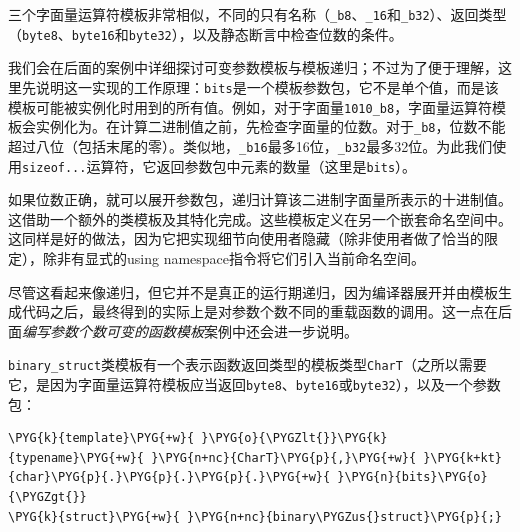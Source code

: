 
三个字面量运算符模板非常相似，不同的只有名称（\texttt{\_\allowbreak{}b8}、\texttt{\_\allowbreak{}16}和\texttt{\_\allowbreak{}b32}）、返回类型（\texttt{byte8}、\texttt{byte16}和\texttt{byte32}），以及静态断言中检查位数的条件。



我们会在后面的案例中详细探讨可变参数模板与模板递归；不过为了便于理解，这里先说明这一实现的工作原理：\texttt{bits}是一个模板参数包，它不是单个值，而是该模板可能被实例化时用到的所有值。例如，对于字面量\texttt{1010\_\allowbreak{}b8}，字面量运算符模板会实例化为。在计算二进制值之前，先检查字面量的位数。对于\texttt{\_\allowbreak{}b8}，位数不能超过八位（包括末尾的零）。类似地，\texttt{\_\allowbreak{}b16}最多16位，\texttt{\_\allowbreak{}b32}最多32位。为此我们使用\texttt{sizeof...}运算符，它返回参数包中元素的数量（这里是\texttt{bits}）。



如果位数正确，就可以展开参数包，递归计算该二进制字面量所表示的十进制值。这借助一个额外的类模板及其特化完成。这些模板定义在另一个嵌套命名空间中。这同样是好的做法，因为它把实现细节向使用者隐藏（除非使用者做了恰当的限定），除非有显式的using namespace指令将它们引入当前命名空间。


\begin{myNote}
尽管这看起来像递归，但它并不是真正的运行期递归，因为编译器展开并由模板生成代码之后，最终得到的实际上是对参数个数不同的重载函数的调用。这一点在后面\textit{编写参数个数可变的函数模板}案例中还会进一步说明。
\end{myNote}



\texttt{binary\_\allowbreak{}struct}类模板有一个表示函数返回类型的模板类型\texttt{CharT}（之所以需要它，是因为字面量运算符模板应当返回\texttt{byte8}、\texttt{byte16}或\texttt{byte32}），以及一个参数包：



\begin{codeblockbg}
\begin{Verbatim}[commandchars=\\\{\},breaklines=true,breakanywhere=true,fontsize=\codefont,xleftmargin=17bp]
\PYG{k}{template}\PYG{+w}{ }\PYG{o}{\PYGZlt{}}\PYG{k}{typename}\PYG{+w}{ }\PYG{n+nc}{CharT}\PYG{p}{,}\PYG{+w}{ }\PYG{k+kt}{char}\PYG{p}{.}\PYG{p}{.}\PYG{p}{.}\PYG{+w}{ }\PYG{n}{bits}\PYG{o}{\PYGZgt{}}
\PYG{k}{struct}\PYG{+w}{ }\PYG{n+nc}{binary\PYGZus{}struct}\PYG{p}{;}
\end{Verbatim}
\end{codeblockbg}


